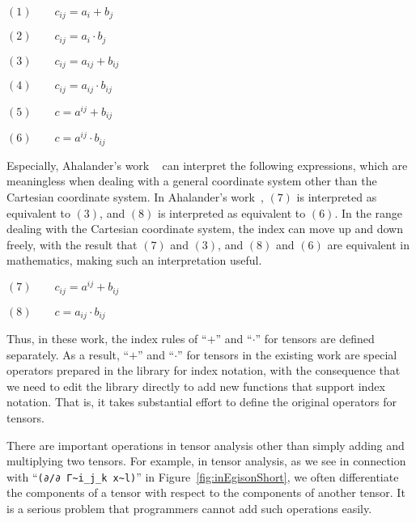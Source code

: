 \documentclass[acmlarge]{acmart}
\begin{document}
$(1) \qquad c_{ij} = a_{i} + b_{j}$

$(2) \qquad c_{ij} = a_{i} \cdot b_{j}$

$(3) \qquad c_{ij} = a_{ij} + b_{ij}$

$(4) \qquad c_{ij} = a_{ij} \cdot b_{ij}$

$(5) \qquad c = a^{ij} + b_{ij}$

$(6) \qquad c = a^{ij} \cdot b_{ij}$

Especially, Ahalander's work ~\cite{aahlander2002einstein} can interpret the following expressions, which are meaningless when dealing with a general coordinate system other than the Cartesian coordinate system.
In Ahalander's work~\cite{aahlander2002einstein}, $(7)$ is interpreted as equivalent to $(3)$, and $(8)$ is interpreted as equivalent to $(6)$.
In the range dealing with the Cartesian coordinate system, the index can move up and down freely, with the result that $(7)$ and $(3)$, and $(8)$ and $(6)$ are equivalent in mathematics, making such an interpretation useful.

$(7) \qquad c_{ij} = a^{ij} + b_{ij}$

$(8) \qquad c = a_{ij} \cdot b_{ij}$

Thus, in these work, the index rules of ``$+$'' and ``$\cdot$'' for tensors are defined separately.
As a result, ``$+$'' and ``$\cdot$'' for tensors in the existing work are special operators prepared in the library for index notation, with the consequence that we need to edit the library directly to add new functions that support index notation.
That is, it takes substantial effort to define the original operators for tensors.

There are important operations in tensor analysis other than simply adding and multiplying two tensors.
For example, in tensor analysis, as we see in connection with ``\verb|(∂/∂ Γ~i_j_k x~l)|'' in Figure~\ref{fig:inEgisonShort}, we often differentiate the components of a tensor with respect to the components of another tensor.
It is a serious problem that programmers cannot add such operations easily.

\end{document}
